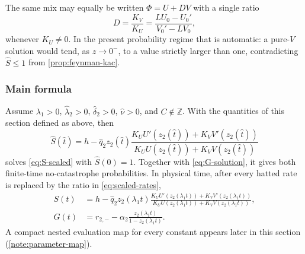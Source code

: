The same mix may equally be written $\Phi=U+D V$ with a single ratio
\begin{equation*}
D=\frac{K_V}{K_U}
=\frac{L U_0-U_0'}{V_0'-L V_0},
\end{equation*}
whenever $K_U\neq0$. In the present probability regime that is automatic: a pure-$V$ solution would tend, as $z\to0^-$, to a value strictly larger than one, contradicting $\widehat S\leq1$ from \cref{prop:feynman-kac}.


\subsubsection{Main formula}

\begin{theorem}
\label{tt:thm:main}
Assume $\lambda_1>0$, $\hat\lambda_2>0$, $\hat\delta_2>0$, $\hat\nu>0$, and $C\notin\mathbb Z$. With the quantities of this section defined as above, then
\begin{equation}
\boxed{
\widehat S(\hat t)=h-
\hat q_2z_2(\hat t)
\frac{K_U U'(z_2(\hat t))+K_V V'(z_2(\hat t))}
{K_U U(z_2(\hat t))+K_V V(z_2(\hat t))}}
\label{eq:S-final}
\end{equation}
solves \cref{eq:S-scaled} with $\widehat S(0)=1$. Together with \cref{eq:G-solution}, it gives both finite-time no-catastrophe probabilities. In physical time, after every hatted rate is replaced by the ratio in \cref{eq:scaled-rates},
\begin{equation}
\label{eq:unscaled-recovery}
\begin{aligned}
S(t)&=h-
\hat q_2z_2(\lambda_1t)
\frac{K_U U'(z_2(\lambda_1t))+K_V V'(z_2(\lambda_1t))}
{K_U U(z_2(\lambda_1t))+K_V V(z_2(\lambda_1t))},\\
G(t)&=r_{2,-}-\alpha_2\frac{z_2(\lambda_1t)}{1-z_2(\lambda_1t)}.
\end{aligned}
\end{equation}
A compact nested evaluation map for every constant appears later in this section (\cref{note:parameter-map}).
\end{theorem}


